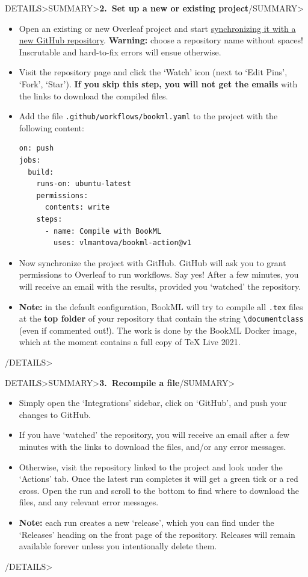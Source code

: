 \documentclass[a4paper,british]{article}
\newenvironment{foldedframe}[1][]{%
    \<DETAILS>\<SUMMARY>\textbf{#1}\</SUMMARY>}%
  {\</DETAILS>}
\newenvironment{foldedframe}[1][]{\bgroup\colorlet{TFFrameColor}{SpringGreen}
  \colorlet{TFTitleColor}{black}\begin{titled-frame}{#1}}{\end{titled-frame}\egroup}
\def\ltxinline{\lstinline[style=bookml,frame=none]}
\begin{document}
\begin{foldedframe}[2.\ Set up a new or existing project]
  \begin{itemize}
    \item Open an existing or new Overleaf project and start \href{https://docs.overleaf.com/integrations-and-add-ons/git-integration-and-github-synchronization/github-synchronization#creating-a-new-github-repository-from-an-overleaf-project}{synchronizing it with a new GitHub repository}. \textbf{Warning:} choose a repository name without spaces! Inscrutable and hard-to-fix errors will ensue otherwise.
    \item Visit the repository page and click the `Watch' icon (next to `Edit Pins', `Fork', `Star'). \textbf{If you skip this step, you will not get the emails} with the links to download the compiled files.
    \item Add the file \texttt{.github/workflows/bookml.yaml} to the project with the following content:
      \begin{lstlisting}[style=yaml,name=bookml.yaml]
on: push
jobs:
  build:
    runs-on: ubuntu-latest
    permissions:
      contents: write
    steps:
      - name: Compile with BookML
        uses: vlmantova/bookml-action@v1
      \end{lstlisting}
    \item Now synchronize the project with GitHub. GitHub will ask you to grant permissions to Overleaf to run workflows. Say yes! After a few minutes, you will receive an email with the results, provided you `watched' the repository.
    \item \textbf{Note:} in the default configuration, BookML will try to compile all \texttt{.tex} files at the \textbf{top folder} of your repository that contain the string \ltxinline|\documentclass| (even if commented out!). The work is done by the BookML Docker image, which at the moment contains a full copy of \TeX{} Live 2021.
  \end{itemize}
\end{foldedframe}

\begin{foldedframe}[3.\ Recompile a file]
  \begin{itemize}
    \item Simply open the `Integrations' sidebar, click on `GitHub', and push your changes to GitHub.
    \item If you have `watched' the repository, you will receive an email after a few minutes with the links to download the files, and/or any error messages.
    \item Otherwise, visit the repository linked to the project and look under the `Actions' tab. Once the latest run completes it will get a green tick or a red cross. Open the run and scroll to the bottom to find where to download the files, and any relevant error messages.
    \item \textbf{Note:} each run creates a new `release', which you can find under the `Releases' heading on the front page of the repository. Releases will remain available forever unless you intentionally delete them.
  \end{itemize}
\end{foldedframe}
\end{document}
